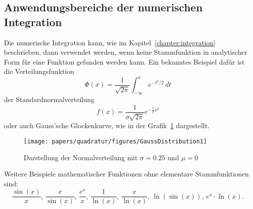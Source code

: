 \subsection{Anwendungsbereiche der numerischen Integration \label{quadratur:subsection:anwendungsbereiche}}
Die numerische Integration kann, wie im Kapitel~\ref{chapter:integration} beschrieben, dann verwendet
werden, wenn keine Stammfunktion in analytischer Form für eine Funktion gefunden werden kann.
Ein bekanntes Beispiel dafür ist die Verteilungsfunktion
\begin{equation}
    \Phi(x) 
    =
    \frac{1}{\sqrt{2\pi}}
    \int_{-\infty}^x e^{-t^2/2}\,dt
\end{equation}
der Standardnormalverteilung
\begin{equation}
    f(x)
    = 
    \frac{1}{\sigma \sqrt{2\pi}}e^{-\frac{1}{2}x^{2}}
\end{equation}
oder auch Gauss'sche Glockenkurve, wie in der Grafik~\ref{quadratur:figure:gaussdistribution} dargestellt. 
\begin{figure}
    \centering
    \texttt{[image: papers/quadratur/figures/GaussDistribution1]}
    \caption{Darstellung der Normalverteilung mit $\sigma=0.25$ und $\mu=0$
    \label{quadratur:figure:gaussdistribution}}
\end{figure}
Weitere Beispiele mathematischer Funktionen ohne elementare Stammfunktionen sind:
\[
    \frac{\sin(x)}{x}, \, 
    \frac{x}{\sin(x)}, \, 
    \frac{e^{x}}{x},  \,
    \frac{1}{\operatorname{ln}(x)}, \, 
    \frac{x}{\operatorname{ln}(x)},  \,
    \operatorname{ln}(\sin(x)),  \,
    e^{x}\cdot\operatorname{ln}(x).
\]
